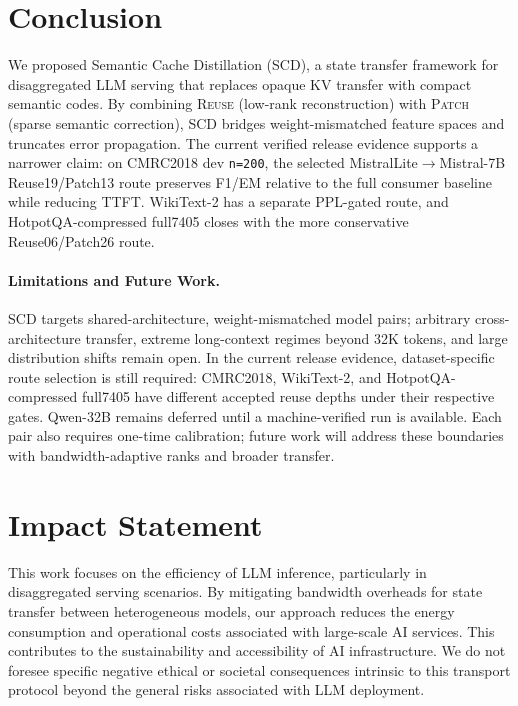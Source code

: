 \documentclass{article}
\theoremstyle{plain}
\theoremstyle{definition}
\theoremstyle{remark}
\begin{document}
\section{Conclusion}
\label{sec:conclusion}


We proposed Semantic Cache Distillation (SCD), a state transfer framework for disaggregated LLM serving that replaces opaque KV transfer with compact semantic codes.
By combining \textsc{Reuse} (low-rank reconstruction) with \textsc{Patch} (sparse semantic correction), SCD bridges weight-mismatched feature spaces and truncates error propagation. The current verified release evidence supports a narrower claim: on CMRC2018 dev \texttt{n=200}, the selected MistralLite$\to$Mistral-7B Reuse19/Patch13 route preserves F1/EM relative to the full consumer baseline while reducing TTFT. WikiText-2 has a separate PPL-gated route, and HotpotQA-compressed full7405 closes with the more conservative Reuse06/Patch26 route.

\paragraph{Limitations and Future Work.}
SCD targets shared-architecture, weight-mismatched model pairs; arbitrary cross-architecture transfer, extreme long-context regimes beyond 32K tokens, and large distribution shifts remain open. In the current release evidence, dataset-specific route selection is still required: CMRC2018, WikiText-2, and HotpotQA-compressed full7405 have different accepted reuse depths under their respective gates. Qwen-32B remains deferred until a machine-verified run is available.
Each pair also requires one-time calibration; future work will address these boundaries with bandwidth-adaptive ranks and broader transfer.




\section*{Impact Statement}

This work focuses on the efficiency of LLM inference, particularly in disaggregated serving scenarios. By mitigating bandwidth overheads for state transfer between heterogeneous models, our approach reduces the energy consumption and operational costs associated with large-scale AI services. This contributes to the sustainability and accessibility of AI infrastructure. We do not foresee specific negative ethical or societal consequences intrinsic to this transport protocol beyond the general risks associated with LLM deployment.
\end{document}
